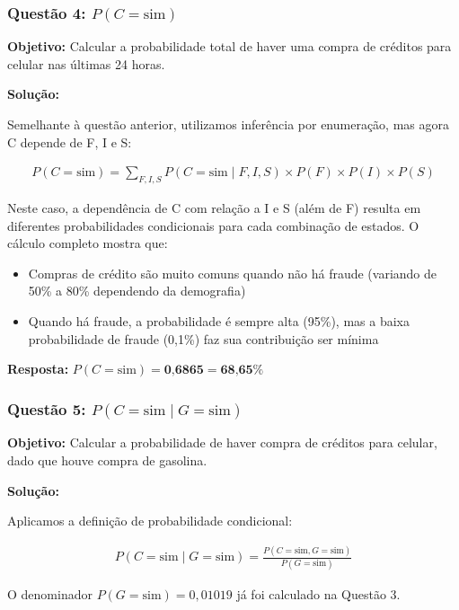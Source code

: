 \documentclass[a4paper,12pt]{article}
\begin{document}
\subsubsection{Questão 4: \texorpdfstring{$P(C=\text{sim})$}{P(C=sim)}}

\textbf{Objetivo:} Calcular a probabilidade total de haver uma compra de créditos para celular nas últimas 24 horas.

\textbf{Solução:}

Semelhante à questão anterior, utilizamos inferência por enumeração, mas agora C depende de F, I e S:

\begin{align}
P(C=\text{sim}) = \sum_{F,I,S} P(C=\text{sim} \mid F,I,S) \times P(F) \times P(I) \times P(S)
\end{align}

Neste caso, a dependência de C com relação a I e S (além de F) resulta em diferentes probabilidades condicionais para cada combinação de estados. O cálculo completo mostra que:

\begin{itemize}
    \item Compras de crédito são muito comuns quando não há fraude (variando de 50\% a 80\% dependendo da demografia)
    \item Quando há fraude, a probabilidade é sempre alta (95\%), mas a baixa probabilidade de fraude (0,1\%) faz sua contribuição ser mínima
\end{itemize}

\textbf{Resposta:} $P(C=\text{sim}) = \textbf{0,6865} = \textbf{68,65\%}$

\subsubsection{Questão 5: \texorpdfstring{$P(C=\text{sim} \mid G=\text{sim})$}{P(C=sim | G=sim)}}

\textbf{Objetivo:} Calcular a probabilidade de haver compra de créditos para celular, dado que houve compra de gasolina.

\textbf{Solução:}

Aplicamos a definição de probabilidade condicional:

\begin{align}
P(C=\text{sim} \mid G=\text{sim}) = \frac{P(C=\text{sim}, G=\text{sim})}{P(G=\text{sim})}
\end{align}

O denominador $P(G=\text{sim}) = 0,01019$ já foi calculado na Questão 3.
\end{document}
